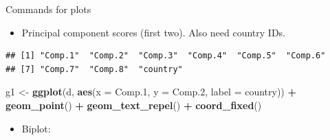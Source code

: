 \documentclass[ignorenonframetext,]{beamer}
\newenvironment{Shaded}{\begin{snugshade}}{\end{snugshade}}
\newcommand{\DataTypeTok}[1]{\textcolor[rgb]{0.13,0.29,0.53}{#1}}
\newcommand{\FloatTok}[1]{\textcolor[rgb]{0.00,0.00,0.81}{#1}}
\newcommand{\KeywordTok}[1]{\textcolor[rgb]{0.13,0.29,0.53}{\textbf{#1}}}
\newcommand{\NormalTok}[1]{#1}
\newcommand{\OperatorTok}[1]{\textcolor[rgb]{0.81,0.36,0.00}{\textbf{#1}}}
\newcommand{\StringTok}[1]{\textcolor[rgb]{0.31,0.60,0.02}{#1}}
\providecommand{\tightlist}{%
  \setlength{\itemsep}{0pt}\setlength{\parskip}{0pt}}
\begin{document}
\begin{frame}[fragile]{Commands for plots}
\protect\hypertarget{commands-for-plots}{}

\begin{itemize}
\tightlist
\item
  Principal component scores (first two). Also need country IDs.
\end{itemize}

\begin{Shaded}
\end{Shaded}

\begin{verbatim}
## [1] "Comp.1"  "Comp.2"  "Comp.3"  "Comp.4"  "Comp.5"  "Comp.6" 
## [7] "Comp.7"  "Comp.8"  "country"
\end{verbatim}

\begin{Shaded}
\begin{Highlighting}[]
\NormalTok{g1 <-}\StringTok{ }\KeywordTok{ggplot}\NormalTok{(d, }\KeywordTok{aes}\NormalTok{(}\DataTypeTok{x =}\NormalTok{ Comp}\FloatTok{.1}\NormalTok{, }\DataTypeTok{y =}\NormalTok{ Comp}\FloatTok{.2}\NormalTok{,}
  \DataTypeTok{label =}\NormalTok{ country)) }\OperatorTok{+}
\StringTok{  }\KeywordTok{geom_point}\NormalTok{() }\OperatorTok{+}\StringTok{ }\KeywordTok{geom_text_repel}\NormalTok{() }\OperatorTok{+}\StringTok{ }\KeywordTok{coord_fixed}\NormalTok{()}
\end{Highlighting}
\end{Shaded}

\begin{itemize}
\tightlist
\item
  Biplot:
\end{itemize}

\begin{Shaded}
\end{Shaded}

\end{frame}
\end{document}
